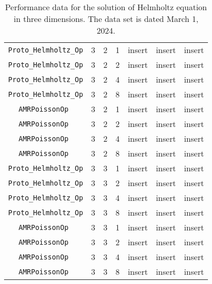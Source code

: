 \documentclass{article}
\begin{document}
\begin{small}
\begin{table}
\begin{center}
\begin{tabular}{|c|c|c|c|c|c||c|}
 {\tt Proto\_Helmholtz\_Op} & 3 & 2   & 1    &  insert  &  insert    & insert    \\
 {\tt Proto\_Helmholtz\_Op} & 3 & 2   & 2    &  insert  &  insert    & insert    \\
 {\tt Proto\_Helmholtz\_Op} & 3 & 2   & 4    &  insert  &  insert    & insert    \\
 {\tt Proto\_Helmholtz\_Op} & 3 & 2   & 8    &  insert  &  insert    & insert    \\
\hline                                                                               
 {\tt AMRPoissonOp        } & 3 & 2   & 1    &  insert  &  insert    & insert   \\
 {\tt AMRPoissonOp        } & 3 & 2   & 2    &  insert  &  insert    & insert   \\
 {\tt AMRPoissonOp        } & 3 & 2   & 4    &  insert  &  insert    & insert   \\
 {\tt AMRPoissonOp        } & 3 & 2   & 8    &  insert  &  insert    & insert   \\
 \hline                                                                               
                                                                                      
 {\tt Proto\_Helmholtz\_Op} & 3 & 3   & 1    &  insert  &  insert    & insert    \\
 {\tt Proto\_Helmholtz\_Op} & 3 & 3   & 2    &  insert  &  insert    & insert    \\
 {\tt Proto\_Helmholtz\_Op} & 3 & 3   & 4    &  insert  &  insert    & insert    \\
 {\tt Proto\_Helmholtz\_Op} & 3 & 3   & 8    &  insert  &  insert    & insert    \\
\hline                                                                               
 {\tt AMRPoissonOp        } & 3 & 3   & 1    &  insert  &  insert    & insert   \\
 {\tt AMRPoissonOp        } & 3 & 3   & 2    &  insert  &  insert    & insert   \\
 {\tt AMRPoissonOp        } & 3 & 3   & 4    &  insert  &  insert    & insert   \\
 {\tt AMRPoissonOp        } & 3 & 3   & 8    &  insert  &  insert    & insert   \\
 \hline
\end{tabular}
\end{center}
\label{tab::helmholtz_3d}
\caption
    {
      Performance data for the solution of Helmholtz
      equation in three dimensions.
      The data set is dated March 1, 2024.
    }
\end{table}
\end{small}
\end{document}
